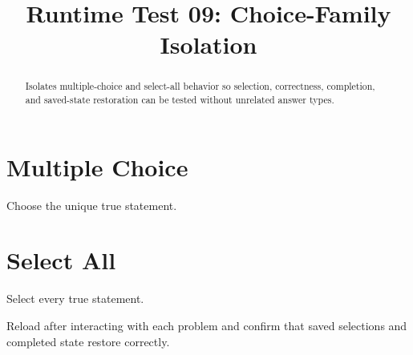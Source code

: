 \documentclass{ximera}
\title{Runtime Test 09: Choice-Family Isolation}
\begin{document}
\begin{abstract}
Isolates multiple-choice and select-all behavior so selection, correctness,
completion, and saved-state restoration can be tested without unrelated answer types.
\end{abstract}
\maketitle

\section{Multiple Choice}

\begin{problem}
Choose the unique true statement.
\begin{multipleChoice}
\end{multipleChoice}
\end{problem}

\section{Select All}

\begin{problem}
Select every true statement.
\begin{selectAll}
\end{selectAll}
\end{problem}

Reload after interacting with each problem and confirm that saved selections and
completed state restore correctly.
\end{document}

